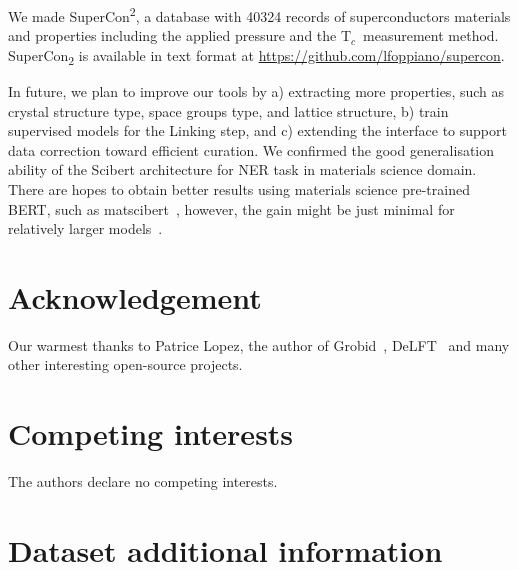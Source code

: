 \documentclass[]{interact}
\theoremstyle{plain}%
\theoremstyle{definition}
\theoremstyle{remark}
\newcommand{\tc}{T$_{c}$}
\begin{document}
We made SuperCon\textsuperscript{2}, a database with 40324 records of superconductors materials and properties including the applied pressure and the \tc~measurement method. 
SuperCon\textsubscript{2} is available in text format at \url{https://github.com/lfoppiano/supercon}.

In future, we plan to improve our tools by a) extracting more properties, such as crystal structure type, space groups type, and lattice structure, b) train supervised models for the Linking step, and c) extending the interface to support data correction toward efficient curation.
We confirmed the good generalisation ability of the Scibert architecture for NER task in materials science domain. 
There are hopes to obtain better results using materials science pre-trained BERT, such as matscibert~\cite{gupta_matscibert_2022}, however, the gain might be just minimal for relatively larger models~\cite{hong2022ScholarBERT}.

\section*{Acknowledgement}
\label{sec:acknowledgement}
Our warmest thanks to Patrice Lopez, the author of Grobid~\cite{GROBID}, DeLFT~\citep{DeLFT} and many other interesting open-source projects.



\section*{Competing interests} 

The authors declare no competing interests.





\appendix

\section{Dataset additional information}
\end{document}
